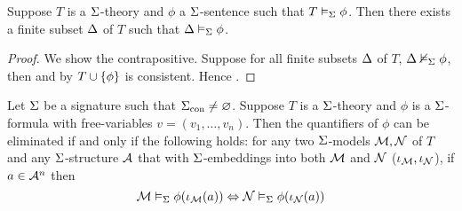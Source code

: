 \begin{lem}
    Suppose $T$ is a $\Si$-theory and $\phi$ a $\Si$-sentence such that 
    $T \model{\Si} \phi$. 
    Then there exists a finite subset $\De$ of $T$ such that 
    $\De \model{\Si} \phi$.
\end{lem}
\begin{proof}
    We show the contrapositive.
    Suppose for all finite subsets $\De$ of $T$, $\De \nodel{\Si} \phi$,
    then  and
    by  $T \cup \set{\phi}$ is consistent.
    Hence .
\end{proof}

\begin{prop}
    Let $\Si$ be a signature such that $\const{\Si} \ne \nothing$.
    Suppose $T$ is a $\Si$-theory and $\phi$ is a $\Si$-formula
    with free-variables $v = (v_1,\dots,v_n)$.
    Then the quantifiers of $\phi$ 
    can be eliminated if and only if the following holds:
    for any two $\Si$-models $\MM,\NN $ of $T$ and any 
    $\Si$-structure $\AA$ that with $\Si$-embeddings into both $\MM$ and $\NN$ 
    ($\io_\MM, \io_\NN$),
    if $a \in \AA^n$ then 
    \[\MM \model{\Si} \phi(\io_\MM (a)) 
    \iff \NN \model{\Si} \phi(\io_\NN (a))\]
\end{prop}
